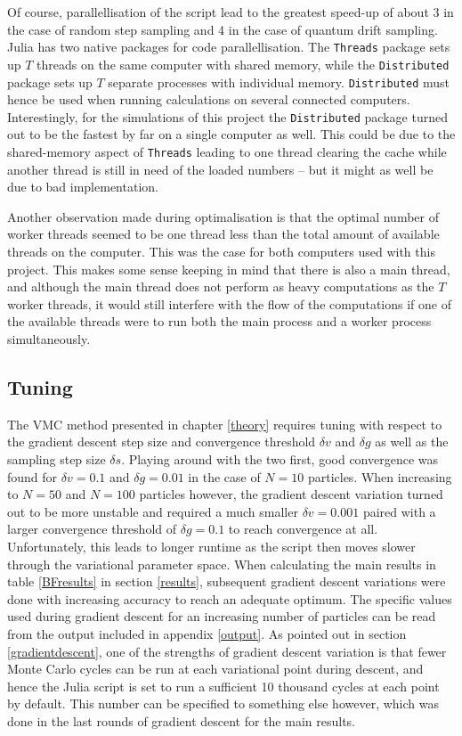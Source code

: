 \documentclass[a4paper,8pt]{article}
\begin{document}
\begin{multicols}{2}
Of course, parallellisation of the script lead to the greatest speed-up of about 3 in the case of random step sampling and 4 in the case of quantum drift sampling. Julia has two native packages for code parallellisation. The \texttt{Threads} package sets up $T$ threads on the same computer with shared memory, while the \texttt{Distributed} package sets up $T$ separate processes with individual memory. \texttt{Distributed} must hence be used when running calculations on several connected computers. Interestingly, for the simulations of this project the \texttt{Distributed} package turned out to be the fastest by far on a single computer as well. This could be due to the shared-memory aspect of \texttt{Threads} leading to one thread clearing the cache while another thread is still in need of the loaded numbers -- but it might as well be due to bad implementation.

Another observation made during optimalisation is that the optimal number of worker threads seemed to be one thread less than the total amount of available threads on the computer. This was the case for both computers used with this project. This makes some sense keeping in mind that there is also a main thread, and although the main thread does not perform as heavy computations as the $T$ worker threads, it would still interfere with the flow of the computations if one of the available threads were to run both the main process and a worker process simultaneously.


\subsection{Tuning}\label{tuning}
The VMC method presented in chapter \ref{theory} requires tuning with respect to the gradient descent step size and convergence threshold $\delta v$ and $\delta g$ as well as the sampling step size $\delta s$. Playing around with the two first, good convergence was found for ${\delta v = 0.1}$ and ${\delta g = 0.01}$ in the case of $N = 10$ particles. When increasing to ${N = 50}$ and ${N = 100}$ particles however, the gradient descent variation turned out to be more unstable and required a much smaller ${\delta v = 0.001}$ paired with a larger convergence threshold of ${\delta g = 0.1}$ to reach convergence at all. Unfortunately, this leads to longer runtime as the script then moves slower through the variational parameter space. When calculating the main results in table \ref{BFresults} in section \ref{results}, subsequent gradient descent variations were done with increasing accuracy to reach an adequate optimum. The specific values used during gradient descent for an increasing number of particles can be read from the output included in appendix \ref{output}. As pointed out in section \ref{gradientdescent}, one of the strengths of gradient descent variation is that fewer Monte Carlo cycles can be run at each variational point during descent, and hence the Julia script is set to run a sufficient 10 thousand cycles at each point by default. This number can be specified to something else however, which was done in the last rounds of gradient descent for the main results.


\end{multicols}
\end{document}
